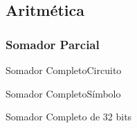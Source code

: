
\subsection{Aritmética}


\begin{frame}
\frametitle{Somador Parcial}

\begin{center}

\end{center}

\end{frame}

\begin{frame}{Somador Completo}{Circuito}

\begin{center}

\end{center}

\end{frame}

\begin{frame}{Somador Completo}{Símbolo}

\begin{center}

\end{center}

\end{frame}

\begin{frame}{Somador Completo de 32 bits}

\begin{center}

\end{center}

\end{frame}

